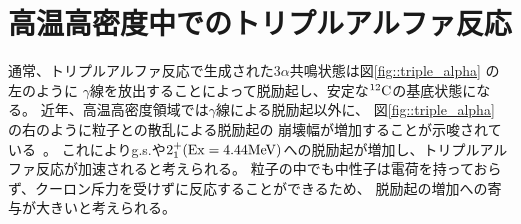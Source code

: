 \section{高温高密度中でのトリプルアルファ反応}
\label{seq::triplealphareaction}
通常、トリプルアルファ反応で生成された$3\alpha$共鳴状態は図\ref{fig::triple_alpha} の左のように
$\gamma$線を放出することによって脱励起し、安定な${}^{12}{\rm C}$の基底状態になる。
近年、高温高密度領域では$\gamma$線による脱励起以外に、
図\ref{fig::triple_alpha} の右のように粒子との散乱による脱励起の
崩壊幅が増加することが示唆されている~\cite{hotdensemedium}。
これによりg.s.や$2_{1}^{+} ({\rm Ex} = 4.44 {\rm MeV}) $への脱励起が増加し、トリプルアルファ反応が加速されると考えられる。
粒子の中でも中性子は電荷を持っておらず、クーロン斥力を受けずに反応することができるため、
脱励起の増加への寄与が大きいと考えられる。



